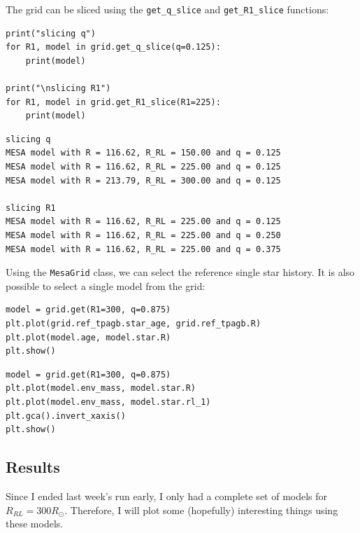 \documentclass[a4paper,10pt]{article}
\begin{document}
The grid can be sliced using the \lstinline[style=output, breaklines=true]|get_q_slice| and \lstinline[style=output, breaklines=true]|get_R1_slice| functions:
\begin{verbatim}
print("slicing q")
for R1, model in grid.get_q_slice(q=0.125):
    print(model)

print("\nslicing R1")
for R1, model in grid.get_R1_slice(R1=225):
    print(model)
\end{verbatim}
\begin{verbatim}
slicing q
MESA model with R = 116.62, R_RL = 150.00 and q = 0.125
MESA model with R = 116.62, R_RL = 225.00 and q = 0.125
MESA model with R = 213.79, R_RL = 300.00 and q = 0.125

slicing R1
MESA model with R = 116.62, R_RL = 225.00 and q = 0.125
MESA model with R = 116.62, R_RL = 225.00 and q = 0.250
MESA model with R = 116.62, R_RL = 225.00 and q = 0.375
\end{verbatim}

Using the \lstinline[style=output, breaklines=true]|MesaGrid| class, we can select the reference single star history. It is also possible to select a single model from the grid:
\begin{verbatim}
model = grid.get(R1=300, q=0.875)
plt.plot(grid.ref_tpagb.star_age, grid.ref_tpagb.R)
plt.plot(model.age, model.star.R)
plt.show()
\end{verbatim}
\begin{figure}[ht]
    \centering
\end{figure}
\begin{verbatim}
model = grid.get(R1=300, q=0.875)
plt.plot(model.env_mass, model.star.R)
plt.plot(model.env_mass, model.star.rl_1)
plt.gca().invert_xaxis()
plt.show()
\end{verbatim}
\begin{figure}[ht]
    \centering
\end{figure}

\subsection{Results}

Since I ended last week's run early, I only had a complete set of models for \(R_{RL} = 300R_\odot \). Therefore, I will plot some (hopefully) interesting things using these models.
\end{document}
